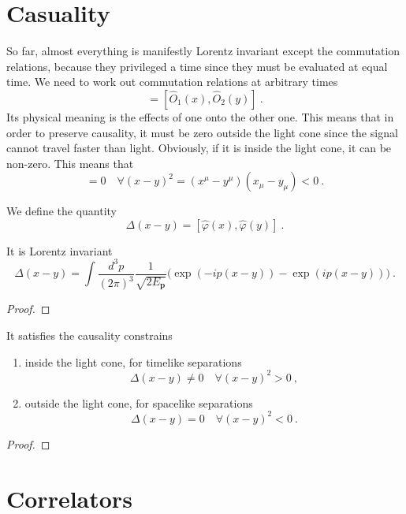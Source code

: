 \section{Casuality} 

    So far, almost everything is manifestly Lorentz invariant except the commutation relations, because they privileged a time since they must be evaluated at equal time. We need to work out commutation relations at arbitrary times 
    \begin{equation*}
        [\hat O_1 (t, \mathbf x), \hat O_2 (t', \mathbf y)] = [\hat O_1 (x), \hat O_2 (y)] ~.
    \end{equation*}
    Its physical meaning is the effects of one onto the other one. This means that in order to preserve causality, it must be zero outside the light cone since the signal cannot travel faster than light. Obviously, if it is inside the light cone, it can be non-zero. This means that
    \begin{equation*}
        [\hat O_1 (x), \hat O_2 (y)] = 0 \quad \forall (x - y)^2 = (x^\mu - y^\mu) (x_\mu - y_\mu) < 0 ~. 
    \end{equation*}

    We define the quantity 
    \begin{equation*}
        \Delta (x - y) = [\hat \varphi (x), \hat \varphi (y)] ~.
    \end{equation*}

    It is Lorentz invariant
    \begin{equation*}
        \Delta (x - y) = \int \frac{d^3 p}{(2 \pi)^3} \frac{1}{\sqrt{2 E_{\mathbf p}}} \Big ( \exp(- i p (x - y)) - \exp(i p (x - y)) \Big) ~.
    \end{equation*}
    \begin{proof}
        
    \end{proof}

    It satisfies the causality constrains
    \begin{enumerate}
        \item inside the light cone, for timelike separations
            \begin{equation*}
                \Delta (x - y) \neq 0 \quad \forall (x - y)^2 > 0 ~,
            \end{equation*}
        \item outside the light cone, for spacelike separations
            \begin{equation*}
                \Delta (x - y) = 0 \quad \forall (x - y)^2 < 0 ~.
            \end{equation*}
    \end{enumerate}
    \begin{proof}
        
    \end{proof}

    
\section{Correlators}